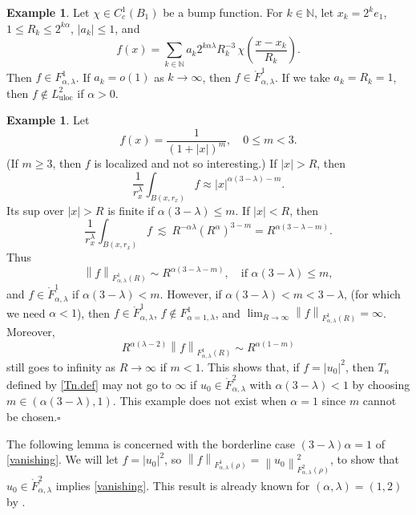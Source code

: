 \documentclass[11pt]{article}
\numberwithin{equation}{section}
\theoremstyle{remark}
\theoremstyle{definition}
\newtheorem{example}[thm]{Example}
\newcommand{\bke}[1]{\left ( #1 \right )}
\newcommand{\norm}[1]{\left \| #1 \right \|}
\newcommand{\lec}{{\ \lesssim \ }}
\newcommand\al{\alpha}
\newcommand\la{\lambda}
\newcommand{\NN}{\mathbb{N}}
\newcommand{\uloc}{{\mathrm{uloc}}}
\begin{document}
\begin{example}\label{exampleS2a}
Let $\chi\in C^1_c(B_1)$ be a bump function.
For $k \in \NN$, let $x_k = 2^ke_1$, $1\le R_k\le 2^{k\al}$, $|a_k|\le 1$, and
\[
f(x) =\sum_{k\in \NN} a_k 2^{k \al \la} R_k^{-3}\,\chi\bke{\frac{x-x_k}{R_k}}.
\]
Then $f\in F^1_{\al, \la}$. If $a_k=o(1)$ as $k \to \infty$, then $f\in \mathring F^1_{\al, \la}$. If we take $a_k=R_k=1$, then $f \not \in L^2_\uloc$ if $\al>0$.
%
\end{example}


\begin{example}\label{exampleS2b}
Let
\[
f(x)= \frac 1{(1+|x|)^{m}} , \quad 0\le m<3.
\]
(If $m\ge3$, then $f $ is localized and not so interesting.)
%
%
%
%
%
%
%
%
If  $|x|>R$, then
\[
\frac1{r_x^{\la}} \int_{B(x,r_x)} f \approx |x|^{\al(3-\la)-m} .
\]
Its sup over $|x|>R$ is finite if $\al(3-\la) \le m$.
If  $|x|<R$, then
\[
\frac1{r_x^{\la}} \int_{B(x,r_x)} f \lec R^{-\al\la} (R^{\al})^{3-m}=R^{\al(3-\la-m)} .
\]
Thus
\[
\norm{f}_{F^1_{\al,\la}(R)} \sim R^{\al(3-\la-m)} , \quad  \text{if }\al(3-\la)\le m ,
\]
and $f\in \mathring F^1_{\al,\la}$ if $\al(3-\la)< m$. However, if $\al(3-\la)< m<3-\la$, (for which we need $\al<1$), then
$f\in \mathring F^1_{\al,\la}$, $f\not \in F^1_{\al=1,\la}$, and $\lim _{R \to \infty} \norm{f}_{F^1_{\al,\la}(R)}=\infty$. Moreover,
\[
R^{\al(\la-2)} \norm{f}_{F^1_{\al,\la}(R)}\sim R^{\al(1-m)}
\]
still goes to infinity as $R \to \infty$ if $m  <1$. This shows that, if $f=|u_0|^2$, then $T_n$ defined by \eqref{Tn.def} may not go to $\infty$ if
$u_0\in \mathring F^2_{\al,\la}$ with $\al(3-\la)< 1$ by choosing $m \in (\al(3-\la), 1)$.
This example does not exist when $\al=1$ since $m$ cannot be chosen.\hfill $\square$
\end{example}

The following lemma is concerned with the borderline case $(3-\la)\al=1$ of \eqref{vanishing}.
We will let $f=|u_0|^2$, so $\norm{f}_{F^{1}_{\al,\lambda}(\rho)} =\norm{u_0}_{F^{2}_{\al,\lambda}(\rho)}^2$, to show that $u_0 \in \mathring F^2_{\al,\la}$ implies \eqref{vanishing}. This result is already known for $(\al,\la)=(1,2)$ by \cite[Lemma 2.1]{BKT}.
\end{document}
